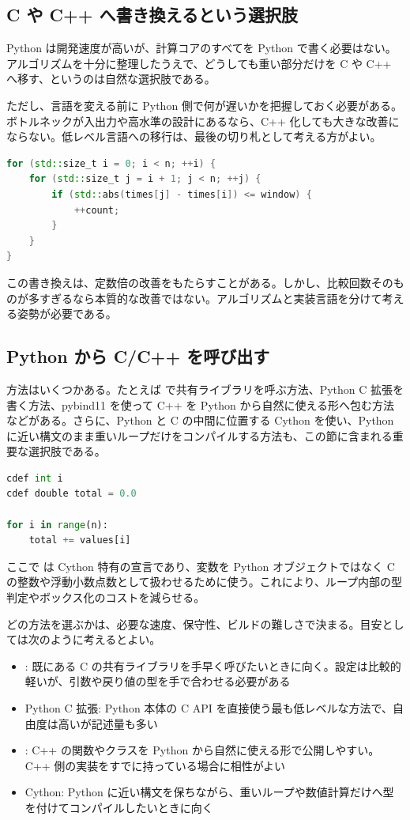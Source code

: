 \subsection{C や C++ へ書き換えるという選択肢}

Python は開発速度が高いが、計算コアのすべてを Python で書く必要はない。アルゴリズムを十分に整理したうえで、どうしても重い部分だけを C や C++ へ移す、というのは自然な選択肢である。

ただし、言語を変える前に Python 側で何が遅いかを把握しておく必要がある。ボトルネックが入出力や高水準の設計にあるなら、C++ 化しても大きな改善にならない。低レベル言語への移行は、最後の切り札として考える方がよい。

\begin{lstlisting}[language=C++]
for (std::size_t i = 0; i < n; ++i) {
    for (std::size_t j = i + 1; j < n; ++j) {
        if (std::abs(times[j] - times[i]) <= window) {
            ++count;
        }
    }
}
\end{lstlisting}

この書き換えは、定数倍の改善をもたらすことがある。しかし、比較回数そのものが多すぎるなら本質的な改善ではない。アルゴリズムと実装言語を分けて考える姿勢が必要である。

\subsection{Python から C/C++ を呼び出す}

方法はいくつかある。たとえば  で共有ライブラリを呼ぶ方法、Python C 拡張を書く方法、pybind11 を使って C++ を Python から自然に使える形へ包む方法などがある。さらに、Python と C の中間に位置する Cython を使い、Python に近い構文のまま重いループだけをコンパイルする方法も、この節に含まれる重要な選択肢である。

\begin{lstlisting}[language=Python]
cdef int i
cdef double total = 0.0

for i in range(n):
    total += values[i]
\end{lstlisting}

ここで  は Cython 特有の宣言であり、変数を Python オブジェクトではなく C の整数や浮動小数点数として扱わせるために使う。これにより、ループ内部の型判定やボックス化のコストを減らせる。

どの方法を選ぶかは、必要な速度、保守性、ビルドの難しさで決まる。目安としては次のように考えるとよい。

\begin{itemize}
\item {}: 既にある C の共有ライブラリを手早く呼びたいときに向く。設定は比較的軽いが、引数や戻り値の型を手で合わせる必要がある
\item Python C 拡張: Python 本体の C API を直接使う最も低レベルな方法で、自由度は高いが記述量も多い
\item {}: C++ の関数やクラスを Python から自然に使える形で公開しやすい。C++ 側の実装をすでに持っている場合に相性がよい
\item Cython: Python に近い構文を保ちながら、重いループや数値計算だけへ型を付けてコンパイルしたいときに向く
\end{itemize}

